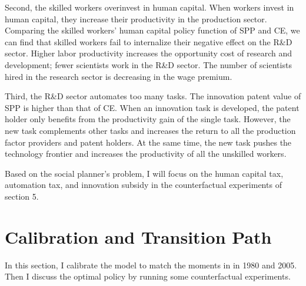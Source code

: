 \documentclass[12pt]{article}
\begin{document}
Second, the skilled workers overinvest in human capital. When workers invest in human capital, they increase their productivity in the production sector. Comparing the skilled workers' human capital policy function of SPP and CE, we can find that skilled workers fail to internalize their negative effect on the R\&D sector. Higher labor productivity increases the opportunity cost of research and development; fewer scientists work in the R\&D sector. The number of scientists hired in the research sector is decreasing in the wage premium.

Third, the R\&D sector automates too many tasks. The innovation patent value of SPP is higher than that of CE. When an innovation task is developed, the patent holder only benefits from the productivity gain of the single task. However, the new task complements other tasks and increases the return to all the production factor providers and patent holders. At the same time, the new task pushes the technology frontier and increases the productivity of all the unskilled workers. 

Based on the social planner's problem, I will focus on the human capital tax, automation tax, and innovation subsidy in the counterfactual experiments of section 5.

\section{Calibration and Transition Path}
In this section, I calibrate the model to match the moments in in 1980 and 2005. Then I discuss the optimal policy by running some counterfactual experiments. 
\end{document}

